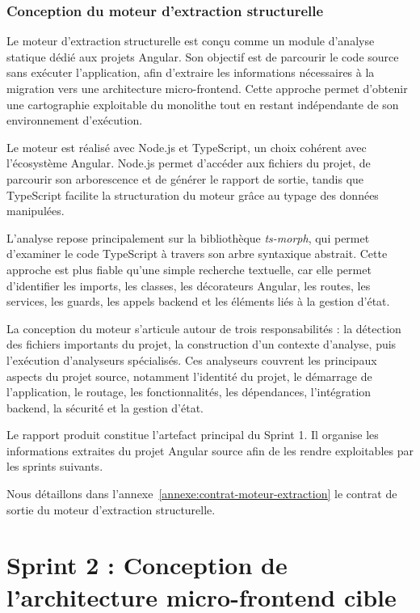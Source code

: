 \subsubsection{Conception du moteur d'extraction structurelle}

Le moteur d'extraction structurelle est conçu comme un module d'analyse statique dédié aux projets Angular. Son objectif est de parcourir le code source sans exécuter l'application, afin d'extraire les informations nécessaires à la migration vers une architecture micro-frontend. Cette approche permet d'obtenir une cartographie exploitable du monolithe tout en restant indépendante de son environnement d'exécution.

Le moteur est réalisé avec Node.js et TypeScript, un choix cohérent avec l'écosystème Angular. Node.js permet d'accéder aux fichiers du projet, de parcourir son arborescence et de générer le rapport de sortie, tandis que TypeScript facilite la structuration du moteur grâce au typage des données manipulées.

L'analyse repose principalement sur la bibliothèque \textit{ts-morph}, qui permet d'examiner le code TypeScript à travers son arbre syntaxique abstrait. Cette approche est plus fiable qu'une simple recherche textuelle, car elle permet d'identifier les imports, les classes, les décorateurs Angular, les routes, les services, les guards, les appels backend et les éléments liés à la gestion d'état.

La conception du moteur s'articule autour de trois responsabilités : la détection des fichiers importants du projet, la construction d'un contexte d'analyse, puis l'exécution d'analyseurs spécialisés. Ces analyseurs couvrent les principaux aspects du projet source, notamment l'identité du projet, le démarrage de l'application, le routage, les fonctionnalités, les dépendances, l'intégration backend, la sécurité et la gestion d'état.

Le rapport produit constitue l'artefact principal du Sprint 1. Il organise les informations extraites du projet Angular source afin de les rendre exploitables par les sprints suivants.

Nous détaillons dans l'annexe~\ref{annexe:contrat-moteur-extraction} le contrat de sortie du moteur d'extraction structurelle.

\section{Sprint 2 : Conception de l'architecture micro-frontend cible}

